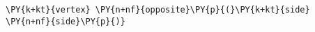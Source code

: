 \begin{Verbatim}[commandchars=\\\{\}]
    \PY{k+kt}{vertex} \PY{n+nf}{opposite}\PY{p}{(}\PY{k+kt}{side} \PY{n+nf}{side}\PY{p}{)}
\end{Verbatim}
